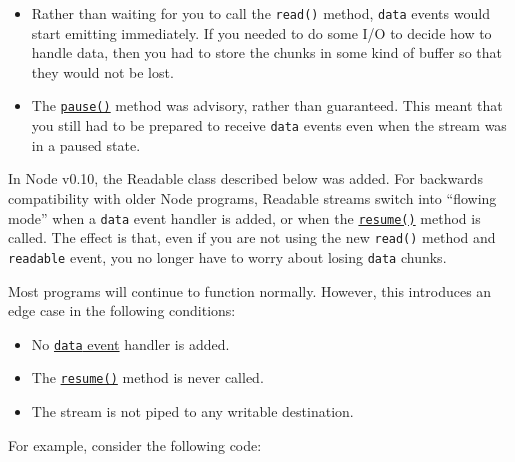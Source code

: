 \begin{itemize}
\itemsep1pt\parskip0pt
\item
  Rather than waiting for you to call the \texttt{read()} method,
  \texttt{\textquotesingle{}data\textquotesingle{}} events would start
  emitting immediately. If you needed to do some I/O to decide how to
  handle data, then you had to store the chunks in some kind of buffer
  so that they would not be lost.
\item
  The \hyperref[streamux5freadableux5fpause]{\texttt{pause()}} method
  was advisory, rather than guaranteed. This meant that you still had to
  be prepared to receive
  \texttt{\textquotesingle{}data\textquotesingle{}} events even when the
  stream was in a paused state.
\end{itemize}

In Node v0.10, the Readable class described below was added. For
backwards compatibility with older Node programs, Readable streams
switch into ``flowing mode'' when a
\texttt{\textquotesingle{}data\textquotesingle{}} event handler is
added, or when the
\hyperref[streamux5freadableux5fresume]{\texttt{resume()}} method is
called. The effect is that, even if you are not using the new
\texttt{read()} method and
\texttt{\textquotesingle{}readable\textquotesingle{}} event, you no
longer have to worry about losing
\texttt{\textquotesingle{}data\textquotesingle{}} chunks.

Most programs will continue to function normally. However, this
introduces an edge case in the following conditions:

\begin{itemize}
\itemsep1pt\parskip0pt
\item
  No
  \hyperref[streamux5feventux5fdata]{\texttt{\textquotesingle{}data\textquotesingle{}}
  event} handler is added.
\item
  The \hyperref[streamux5freadableux5fresume]{\texttt{resume()}} method
  is never called.
\item
  The stream is not piped to any writable destination.
\end{itemize}

For example, consider the following code:

\begin{Shaded}
\begin{Highlighting}[]
\NormalTok{(}

  \NormalTok{(}\NormalTok{, }\NormalTok{() \{}
    \NormalTok{(}\NormalTok{);}
  \NormalTok{\});}

\NormalTok{(}\NormalTok{);}
\end{Highlighting}
\end{Shaded}

